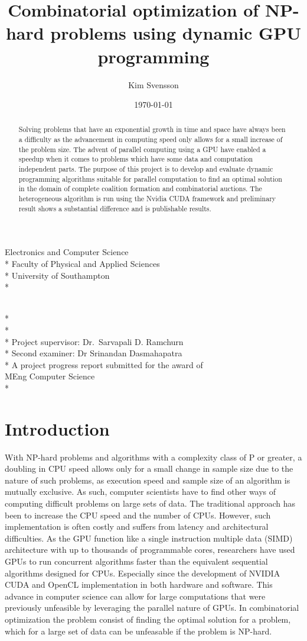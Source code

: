 \documentclass[a4paper, 12pt]{report}
\newcommand{\tdegree}{A project progress report submitted for the award of\\}
\newcommand{\degree}{\tdegree MEng Computer Science\\*}
\newcommand{\texam}{Second examiner: }
\newcommand{\exam}{\texam Dr Srinandan Dasmahapatra}
\newcommand{\tsupervisor}{Project supervisor: }
\newcommand{\supervisor}{\tsupervisor Dr.\ Sarvapali D. Ramchurn}
\newcommand{\school}{Electronics and Computer Science \\*
Faculty of Physical and Applied Sciences\\*
University of Southampton\\*}
\newenvironment{changemargin}[2]{%
\begin{list}{}{%
\setlength{\topsep}{0pt}%
\setlength{\leftmargin}{#1}%
\setlength{\rightmargin}{#2}%
\setlength{\listparindent}{\parindent}%
\setlength{\itemindent}{\parindent}%
\setlength{\parsep}{\parskip}%
}%
\item[]}{\end{list}}
\begin{document}
\author{Kim Svensson}
\date{\today}
\title{Combinatorial optimization of NP-hard problems using dynamic GPU programming}

\makeatletter
\begin{titlepage}
\begin{changemargin}{-2cm}{-2cm}
\begin{center}
\LARGE\school %

\LARGE
\vfill
\@author \\*
\@date \\*
\doublespacing
\@title \\*
\vfill
\singlespacing
\supervisor \\*
\exam \\*
\vfill
\degree
\end{center} 
\end{changemargin}
\end{titlepage}
\makeatother

\begin{abstract}
Solving problems that have an exponential growth in time and space have always been a difficulty as the advancement in computing speed only allows for a small increase of the problem size. The advent of parallel computing using a GPU have enabled a speedup when it comes to problems which have some data and computation independent parts.
The purpose of this project is to develop and evaluate dynamic programming algorithms suitable for parallel computation to find an optimal solution in the domain of complete coalition formation and combinatorial auctions. The heterogeneous algorithm is run using the Nvidia CUDA framework and preliminary result shows a substantial difference and is publishable results.

\end{abstract}
\tableofcontents
\newpage
\section{Introduction}

With NP-hard problems and algorithms with a complexity class of P or greater, a doubling in CPU speed allows only for a small change in sample size due to the nature of such problems, as execution speed and sample size of an algorithm is mutually exclusive.
As such, computer scientists have to find other ways of computing difficult problems on large sets of data.
The traditional approach has been to increase the CPU speed and the number of CPUs.
However, such implementation is often costly and suffers from latency and architectural difficulties.
As the GPU function like a single instruction multiple data (SIMD) architecture with up to thousands of programmable cores, researchers have used GPUs to run concurrent algorithms faster than the equivalent sequential algorithms designed for CPUs. Especially since the development of NVIDIA CUDA and OpenCL implementation in both hardware and software.
This advance in computer science can allow for large computations that were previously unfeasible by leveraging the parallel nature of GPUs. In combinatorial optimization the problem consist of finding the optimal solution for a problem, which for a large set of data can be unfeasable if the problem is NP-hard.
\end{document}
